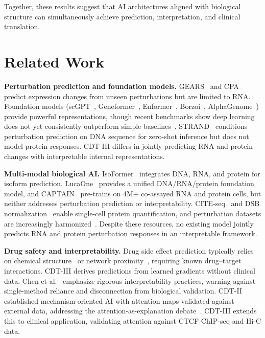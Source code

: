 \documentclass{article}
\begin{document}
Together, these results suggest that AI architectures aligned with biological structure can simultaneously achieve prediction, interpretation, and clinical translation.

\section{Related Work}

\textbf{Perturbation prediction and foundation models.}
GEARS~\citep{roohani2024gears} and CPA~\citep{lotfollahi2023cpa} predict expression changes from unseen perturbations but are limited to RNA. Foundation models (scGPT~\citep{cui2024scgpt}, Geneformer~\citep{theodoris2023}, Enformer~\citep{avsec2021enformer}, Borzoi~\citep{linder2025borzoi}, AlphaGenome~\citep{avsec2026alphagenome}) provide powerful representations, though recent benchmarks show deep learning does not yet consistently outperform simple baselines~\citep{hetzel2025baselines,piran2024perteval}. STRAND~\citep{bunne2026strand} conditions perturbation prediction on DNA sequence for zero-shot inference but does not model protein responses. CDT-III differs in jointly predicting RNA and protein changes with interpretable internal representations.

\textbf{Multi-modal biological AI.}
IsoFormer~\citep{chen2024isoformer} integrates DNA, RNA, and protein for isoform prediction. LucaOne~\citep{he2025lucaone} provides a unified DNA/RNA/protein foundation model, and CAPTAIN~\citep{ji2025captain} pre-trains on 4M+ co-assayed RNA and protein cells, but neither addresses perturbation prediction or interpretability. CITE-seq~\citep{stoeckius2017} and DSB normalization~\citep{muleisenburger2020} enable single-cell protein quantification, and perturbation datasets are increasingly harmonized~\citep{peidli2024scperturb,heumos2025pertpy}. Despite these resources, no existing model jointly predicts RNA and protein perturbation responses in an interpretable framework.

\textbf{Drug safety and interpretability.}
Drug side effect prediction typically relies on chemical structure~\citep{zitnik2018decagon} or network proximity~\citep{guney2016}, requiring known drug--target interactions. CDT-III derives predictions from learned gradients without clinical data. Chen et al.~\citep{chen2024iml} emphasize rigorous interpretability practices, warning against single-method reliance and disconnection from biological validation. CDT-II~\citep{ota2026cdtii} established mechanism-oriented AI with attention maps validated against external data, addressing the attention-as-explanation debate~\citep{jain2019attention,wiegreffe2019attention}. CDT-III extends this to clinical application, validating attention against CTCF ChIP-seq and Hi-C data.
\end{document}
